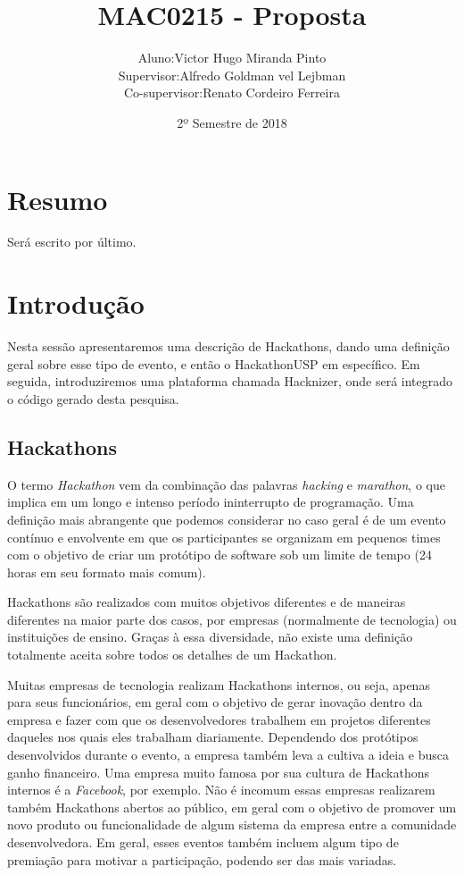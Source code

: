 \documentclass[10pt,twoside,a4paper]{article}
\title{MAC0215 - Proposta}
\author{
  \begin{tabular}{rl}
    Aluno:      & Victor Hugo Miranda Pinto \\
    Supervisor: & Alfredo Goldman vel Lejbman \\
    Co-supervisor: & Renato Cordeiro Ferreira
  \end{tabular}
}
\date{2º Semestre de 2018}
\begin{document}
\onehalfspacing

\maketitle

\section{Resumo}
  Será escrito por último.

\section{Introdução}

  Nesta sessão apresentaremos uma descrição de Hackathons, dando uma definição geral sobre esse tipo de evento, e então o HackathonUSP em específico. Em seguida, introduziremos uma plataforma chamada Hacknizer, onde será integrado o código gerado desta pesquisa.

  \subsection{Hackathons}
  
    O termo \textit{Hackathon} vem da combinação das palavras \textit{hacking} e \textit{marathon}, o que implica em um longo e intenso período ininterrupto de programação. Uma definição mais abrangente que podemos considerar no caso geral é de um evento contínuo e envolvente em que os participantes se organizam em pequenos times com o objetivo de criar um protótipo de software sob um limite de tempo (24 horas em seu formato mais comum). \cite{Komssi2015WhatFor}
    
    Hackathons são realizados com muitos objetivos diferentes e de maneiras diferentes na maior parte dos casos, por empresas (normalmente de tecnologia) ou instituições de ensino. Graças à essa diversidade, não existe uma definição totalmente aceita sobre todos os detalhes de um Hackathon.
    
    Muitas empresas de tecnologia realizam Hackathons internos, ou seja, apenas para seus funcionários, em geral com o objetivo de gerar inovação dentro da empresa e fazer com que os desenvolvedores trabalhem em projetos diferentes daqueles nos quais eles trabalham diariamente. Dependendo dos protótipos desenvolvidos durante o evento, a empresa também leva a cultiva a ideia e busca ganho financeiro. Uma empresa muito famosa por sua cultura de Hackathons internos é a \textit{Facebook}, por exemplo. Não é incomum essas empresas realizarem também Hackathons abertos ao público, em geral com o objetivo de promover um novo produto ou funcionalidade de algum sistema da empresa entre a comunidade desenvolvedora. Em geral, esses eventos também incluem algum tipo de premiação para motivar a participação, podendo ser das mais variadas.
    
\end{document}

